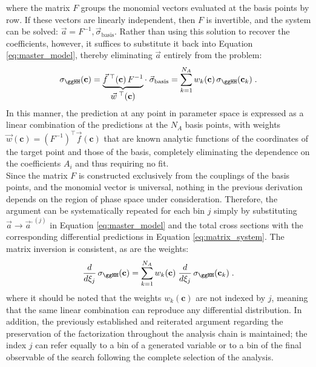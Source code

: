 %
where the matrix $F$ groups the monomial vectors evaluated at the basis points by row. If these vectors are linearly independent, then $F$ is invertible, and the system can be solved: $\vec{a} = F^{-1},\vec{\sigma}_{\text{basis}}$. Rather than using this solution to recover the coefficients, however, it suffices to substitute it back into Equation \ref{eq:master_model}, thereby eliminating $\vec{a}$ entirely from the problem:
%
\begin{equation}
    \sigma_{\ggHH}(\mathbf{c})
    = \underbrace{\vec{f}^{\;\top}(\mathbf{c})\,F^{-1}}_{\textstyle \vec{w}^{\;\top}(\mathbf{c})}
      \cdot\;\vec{\sigma}_{\text{basis}}
    = \sum_{k=1}^{N_A} w_k(\mathbf{c})\,\sigma_{\ggHH}(\mathbf{c}_k)\;.
\label{eq:matrix_master}
\end{equation}
In this manner, the prediction at any point in parameter space is expressed as a linear combination of the predictions at the $N_A$ basis points, with weights $\vec{w}(\mathbf{c}) = \left(F^{-1}\right)^{\top}\vec{f}(\mathbf{c})$ that are known analytic functions of the coordinates of the target point and those of the basis, completely eliminating the dependence on the coefficients $A_i$ and thus requiring no fit.\\

Since the matrix $F$ is constructed exclusively from the couplings of the basis points, and the monomial vector is universal, nothing in the previous derivation depends on the region of phase space under consideration. Therefore, the argument can be systematically repeated for each bin $j$ simply by substituting $\vec{a}\to\vec{a}^{,(j)}$ in Equation \ref{eq:master_model} and the total cross sections with the corresponding differential predictions in Equation \ref{eq:matrix_system}. The matrix inversion is consistent, as are the weights:
%
\begin{equation}
    \frac{d}{d\xi_j}\,\sigma_{\ggHH}(\mathbf{c})
    = \sum_{k=1}^{N_A} w_k(\mathbf{c})\;
      \frac{d}{d\xi_j}\,\sigma_{\ggHH}(\mathbf{c}_k)\;.
\label{eq:matrix_differential}
\end{equation}
%
where it should be noted that the weights $w_k(\mathbf{c})$ are not indexed by $j$, meaning that the same linear combination can reproduce any differential distribution. In addition, the previously established and reiterated argument regarding the preservation of the factorization throughout the analysis chain is maintained; the index $j$ can refer equally to a bin of a generated variable or to a bin of the final observable of the search following the complete selection of the analysis.\\

